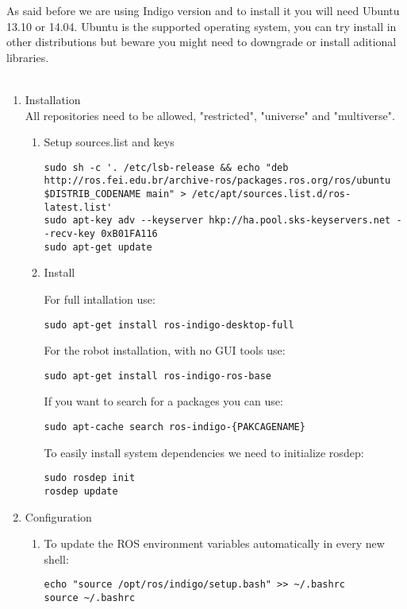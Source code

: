 \documentclass{article}
\begin{document}
As said before we are using Indigo version and to install it you will need
Ubuntu 13.10 or 14.04. Ubuntu is the supported operating system, you can try
install in other distributions but beware you might need to downgrade or install
aditional libraries.
\\
\\
\begin{enumerate}
\item Installation
\\
All repositories need to be allowed, "restricted", "universe" and "multiverse".
\begin{enumerate}

\item Setup sources.list and keys
\begin{lstlisting}
sudo sh -c '. /etc/lsb-release && echo "deb http://ros.fei.edu.br/archive-ros/packages.ros.org/ros/ubuntu $DISTRIB_CODENAME main" > /etc/apt/sources.list.d/ros-latest.list'
sudo apt-key adv --keyserver hkp://ha.pool.sks-keyservers.net --recv-key 0xB01FA116
sudo apt-get update
\end{lstlisting}
\item Install

For full intallation use:
\begin{lstlisting}
sudo apt-get install ros-indigo-desktop-full
\end{lstlisting}

For the robot installation, with no GUI tools use:
\begin{lstlisting}
sudo apt-get install ros-indigo-ros-base
\end{lstlisting}

If you want to search for a packages you can use:
\begin{lstlisting}
sudo apt-cache search ros-indigo-{PAKCAGENAME}
\end{lstlisting}

To easily install system dependencies we need to initialize rosdep:
\begin{lstlisting}
sudo rosdep init
rosdep update
\end{lstlisting}
\end{enumerate}

\item Configuration
\begin{enumerate}

\item To update the ROS environment variables automatically in every new shell:
\begin{lstlisting}
echo "source /opt/ros/indigo/setup.bash" >> ~/.bashrc
source ~/.bashrc
\end{lstlisting}


\end{enumerate}
\end{enumerate}
\end{document}
